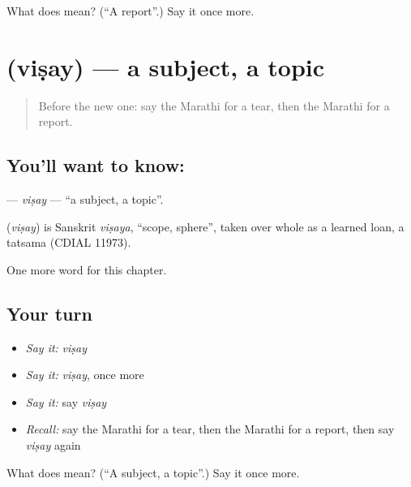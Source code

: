 \begin{tcolorbox}[breakable,colback=teal!4,colframe=teal!35!black,title={Before you move on}]
What does  mean? (\textquotedblleft{}A report\textquotedblright{}.) Say it once more.
\end{tcolorbox}
\section[\texorpdfstring{\mr{विषय} (viṣay)}{विषय (viṣay)}]{ (viṣay) — a subject, a topic}

\label{lesson:MR-C221-visay}



\begin{quote}
Before the new one: say the Marathi for a tear, then the Marathi for a report.
\end{quote}

\subsection*{You'll want to know: }
\textbf{} — \emph{viṣay} — \textquotedblleft{}a subject, a topic\textquotedblright{}.

\begin{cousinweb}
\textbf{} (\emph{viṣay}) is Sanskrit \emph{viṣaya}, \textquotedblleft{}scope, sphere\textquotedblright{}, taken over whole as a learned loan, a tatsama (CDIAL 11973).
\end{cousinweb}

\begin{grammarlens}[title={What you've built}]
One more word for this chapter.
\end{grammarlens}

\subsection*{Your turn}
\begin{itemize}
\raggedright
  \item \emph{Say it:} \emph{viṣay}
  \item \emph{Say it:} \emph{viṣay}, once more
  \item \emph{Say it:} say \emph{viṣay}
  \item \emph{Recall:} say the Marathi for a tear, then the Marathi for a report, then say \emph{viṣay} again
\end{itemize}

\begin{tcolorbox}[breakable,colback=teal!4,colframe=teal!35!black,title={Before you move on}]
What does  mean? (\textquotedblleft{}A subject, a topic\textquotedblright{}.) Say it once more.
\end{tcolorbox}
